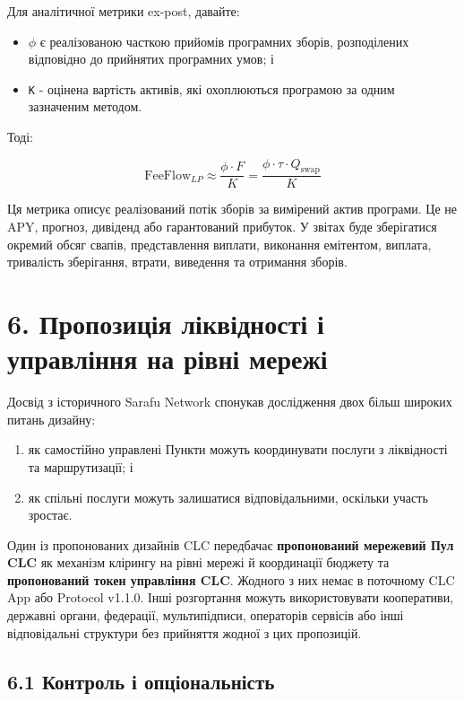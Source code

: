 \documentclass[11pt]{article}
\begin{document}
Для аналітичної метрики ex-post, давайте:

\begin{itemize}[leftmargin=*]
\item \texttt{$\phi$} є реалізованою часткою прийомів програмних зборів, розподілених відповідно до прийнятих програмних умов; і
\item \texttt{K} - оцінена вартість активів, які охоплюються програмою за одним зазначеним методом.
\end{itemize}
Тоді:

\[
\mathrm{FeeFlow}_{LP} \approx \frac{\phi \cdot F}{K} = \frac{\phi \cdot \tau \cdot Q_{\mathrm{swap}}}{K}
\]

Ця метрика описує реалізований потік зборів за вимірений актив програми. Це не APY, прогноз, дивіденд або гарантований прибуток. У звітах буде зберігатися окремий обсяг свапів, представлення виплати, виконання емітентом, виплата, тривалість зберігання, втрати, виведення та отримання зборів.


\section*{6. Пропозиція ліквідності і управління на рівні мережі}

Досвід з історичного Sarafu Network спонукав дослідження двох більш широких питань дизайну:

\begin{enumerate}[leftmargin=*]
\item як самостійно управлені Пункти можуть координувати послуги з ліквідності та маршрутизації; і
\item як спільні послуги можуть залишатися відповідальними, оскільки участь зростає.
\end{enumerate}
Один із пропонованих дизайнів CLC передбачає \textbf{пропонований мережевий Пул CLC} як механізм клірингу на рівні мережі й координації бюджету та \textbf{пропонований токен управління CLC}. Жодного з них немає в поточному CLC App або Protocol v1.1.0. Інші розгортання можуть використовувати кооперативи, державні органи, федерації, мультипідписи, операторів сервісів або інші відповідальні структури без прийняття жодної з цих пропозицій.

\subsection*{6.1 Контроль і опціональність}
\end{document}
